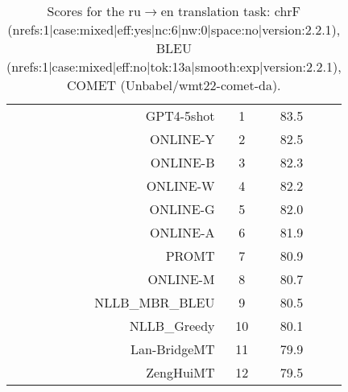\documentclass[11pt]{article}
\begin{document}
\begin{table}
\begin{subtable}[t]{0.33\textwidth}
\begin{tabular}{rccc}
GPT4-5shot & 1 & 83.5 \\ 
ONLINE-Y & 2 & 82.5 \\ 
ONLINE-B & 3 & 82.3 \\ 
ONLINE-W & 4 & 82.2 \\ 
ONLINE-G & 5 & 82.0 \\ 
ONLINE-A & 6 & 81.9 \\ 
PROMT & 7 & 80.9 \\ 
ONLINE-M & 8 & 80.7 \\ 
NLLB\_MBR\_BLEU & 9 & 80.5 \\ 
NLLB\_Greedy & 10 & 80.1 \\ 
Lan-BridgeMT & 11 & 79.9 \\ 
ZengHuiMT & 12 & 79.5 \\ 
\bottomrule 
\end{tabular} 
\end{subtable} 
\caption{Scores for the ru$\rightarrow$en translation task: chrF (nrefs:1|case:mixed|eff:yes|nc:6|nw:0|space:no|version:2.2.1), BLEU (nrefs:1|case:mixed|eff:no|tok:13a|smooth:exp|version:2.2.1), COMET (Unbabel/wmt22-comet-da).} 
\end{table} 
\end{document}
